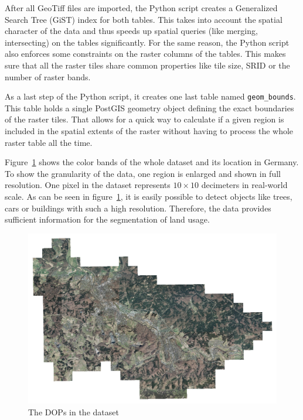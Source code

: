 After all GeoTiff files are imported, the Python script creates a Generalized Search Tree (GiST) index for both tables. This takes into account the spatial character of the data and thus speeds up spatial queries (like merging, intersecting) on the tables significantly. For the same reason, the Python script also enforces some constraints on the raster columns of the tables. This makes sure that all the raster tiles share common properties like tile size, SRID or the number of raster bands.

As a last step of the Python script, it creates one last table named \texttt{geom\_bounds}. This table holds a single PostGIS geometry object defining the exact boundaries of the raster tiles. That allows for a quick way to calculate if a given region is included in the spatial extents of the raster without having to process the whole raster table all the time.

Figure~\ref{fig:dop_rgb_all} shows the color bands of the whole dataset and its location in Germany. To show the granularity of the data, one region is enlarged and shown in full resolution. One pixel in the dataset represents $10\times 10$ decimeters in real-world scale. As can be seen in figure~\ref{fig:dop_rgb_all}, it is easily possible to detect objects like trees, cars or buildings with such a high resolution. Therefore, the data provides sufficient information for the segmentation of land usage.

\begin{figure}[h]
    \centering
    \includegraphics[width=\textwidth]{images/dop_rgb_all}
    \caption{The DOPs in the dataset}
    \label{fig:dop_rgb_all}
\end{figure}

